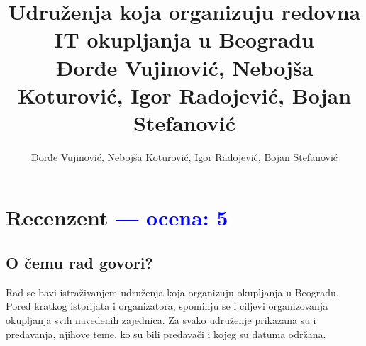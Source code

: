 \documentclass[a4paper]{report}
\newcommand{\odgovor}[1]{\textcolor{blue}{#1}}
\begin{document}
\title{Udruženja koja organizuju redovna IT okupljanja u Beogradu\\ \small{Đorđe Vujinović, Nebojša Koturović, Igor Radojević, Bojan Stefanović}}
\author{Đorđe Vujinović, Nebojša Koturović, Igor Radojević, Bojan Stefanović}

\maketitle

\tableofcontents
 
\chapter{Recenzent \odgovor{--- ocena: 5} }


\section{O čemu rad govori?}
Rad se bavi istraživanjem udruženja koja organizuju okupljanja u Beogradu. 
Pored kratkog istorijata i organizatora, spominju se i ciljevi organizovanja 
okupljanja svih navedenih zajednica. Za svako udruženje prikazana su i predavanja, 
njihove teme, ko su bili predavači i kojeg su datuma održana.
\end{document}
